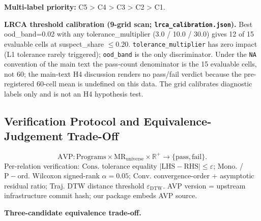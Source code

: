 \documentclass[manuscript,screen,review]{acmart}
\begin{document}
\textbf{Multi-label priority:} C5 \textgreater{} C4 \textgreater{} C3
\textgreater{} C2 \textgreater{} C1.

\textbf{LRCA threshold calibration (9-grid scan;
\texttt{lrca\_calibration.json}).} Best ood\_band=0.02 with any
tolerance\_multiplier (3.0 / 10.0 / 30.0) gives 12 of 15 evaluable
cells at suspect\_share $\leq 0.20$.
\texttt{tolerance\_multiplier} has zero impact (L1 tolerance
rarely triggered); \texttt{ood\_band} is the only discriminator. Under
the \texttt{NA} convention of the main text the pass-count denominator
is the 15 evaluable cells, not 60; the main-text H4 discussion renders
no pass/fail verdict because the pre-registered 60-cell mean is
undefined on this data. The grid calibrates diagnostic labels only and
is not an H4 hypothesis test.

\subsection{Verification Protocol and Equivalence-Judgement Trade-Off}\label{a.3-avp-protocol-specification-and-equivalence-judgement-trade-off}

\[
\mathrm{AVP}: \mathrm{Programs} \times \mathrm{MR}_{\mathrm{universe}} \times \mathbb{R}^{+} \to \{\mathrm{pass}, \mathrm{fail}\}.
\]
Per-relation verification: $\mathrm{Cons.}$ tolerance equality $|\mathrm{LHS} -
\mathrm{RHS}| \leq \varepsilon$; $\mathrm{Mono.}$ / $\mathrm{P-ord.}$ Wilcoxon signed-rank $\alpha=0.05$; $\mathrm{Conv.}$
convergence-order + asymptotic residual ratio; Traj. DTW distance
threshold $\varepsilon_{\mathrm{DTW}}$. AVP version = upstream infrastructure commit hash; our package embeds
AVP source.

\textbf{Three-candidate equivalence trade-off.}
\end{document}

